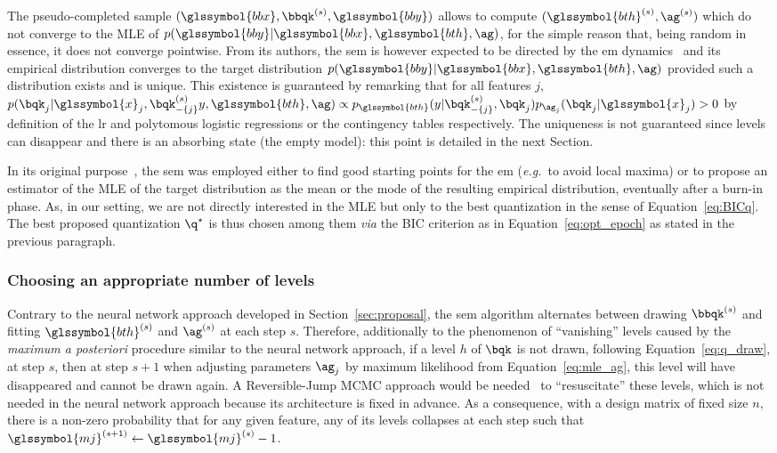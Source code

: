 The pseudo-completed sample $(\glssymbol{bbx}, \bbqk^{(s)}, \glssymbol{bby})$ allows to compute $({\glssymbol{bth}}^{(s)},{\ag}^{(s)})$ which do not converge to the MLE of $p(\glssymbol{bby} | \glssymbol{bbx}, \glssymbol{bth}, \ag)$, for the simple reason that, being random in essence, it does not converge pointwise. From its authors, the \gls{sem} is however expected to be directed by the \gls{em} dynamics~\cite{celeux_sem} and its empirical distribution converges to the target distribution $p(\glssymbol{bby} | \glssymbol{bbx}, \glssymbol{bth}, \ag)$ provided such a distribution exists and is unique. This existence is guaranteed by remarking that for all features $j$, $ p(\bqk_j | \glssymbol{x}_j, \bqk^{(s)}_{-\{j\}} y, \glssymbol{bth}, \ag) \propto p_{\glssymbol{bth}}(y | \bqk^{(s)}_{-\{j\}}, \bqk_j) p_{\ag_j}(\bqk_j | \glssymbol{x}_j) > 0 $ by definition of the \gls{lr} and polytomous logistic regressions or the contingency tables respectively. The uniqueness is not guaranteed since levels can disappear and there is an absorbing state (the empty model): this point is detailed in the next Section.

In its original purpose~\cite{celeux_sem}, the \gls{sem} was employed either to find good starting points for the \gls{em} (\textit{e.g.}\ to avoid local maxima) or to propose an estimator of the MLE of the target distribution as the mean or the mode of the resulting empirical distribution, eventually after a burn-in phase. As, in our setting, we are not directly interested in the MLE but only to the best quantization in the sense of Equation~\eqref{eq:BICq}. The best proposed quantization $\q^\star$ is thus chosen among them \textit{via} the BIC criterion as in Equation~\eqref{eq:opt_epoch} as stated in the previous paragraph.

\subsubsection{Choosing an appropriate number of levels} \label{par:choosing_sem}

Contrary to the neural network approach developed in Section~\ref{sec:proposal}, the \gls{sem} algorithm alternates between drawing $\bbqk^{(s)}$ and fitting ${\glssymbol{bth}}^{(s)}$ and ${\ag}^{(s)}$  at each step $s$. Therefore, additionally to the phenomenon of ``vanishing'' levels caused by the \textit{maximum a posteriori} procedure similar to the neural network approach, if a level $h$ of $\bqk$ is not drawn, following Equation~\eqref{eq:q_draw}, at step $s$, then at step $s+1$ when adjusting parameters $\ag_j$ by maximum likelihood from Equation~\eqref{eq:mle_ag}, this level will have disappeared and cannot be drawn again. A Reversible-Jump MCMC approach would be needed~\cite{green1995reversible} to ``resuscitate'' these levels, which is not needed in the neural network approach because its architecture is fixed in advance. As a consequence, with a design matrix of fixed size $n$, there is a non-zero probability that for any given feature, any of its levels collapses at each step such that $\glssymbol{mj}^{(s+1)} \leftarrow \glssymbol{mj}^{(s)} - 1$.

